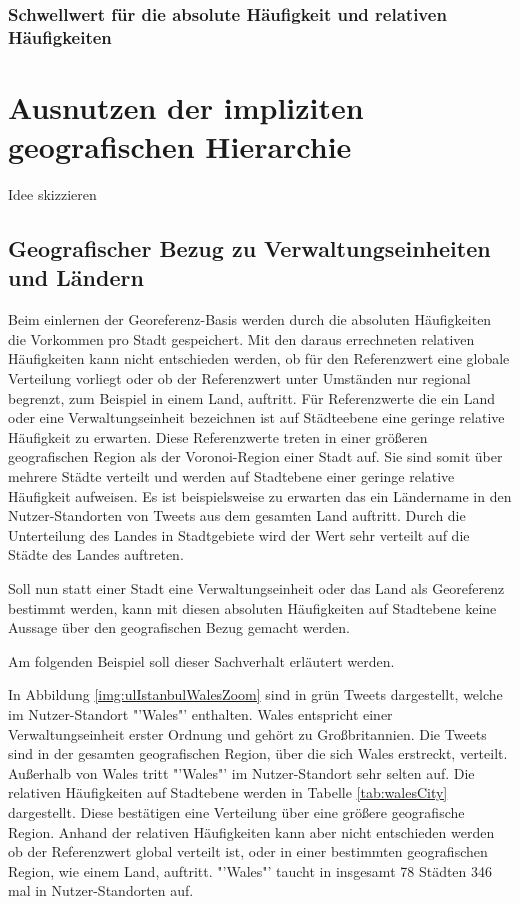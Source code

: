 		\subsubsection{Schwellwert für die absolute Häufigkeit und relativen Häufigkeiten}  

	\section{Ausnutzen der impliziten geografischen Hierarchie}

		Idee skizzieren

		\subsection{Geografischer Bezug zu Verwaltungseinheiten und Ländern} 

			Beim einlernen der Georeferenz-Basis werden durch die absoluten Häufigkeiten die Vorkommen pro Stadt gespeichert.
			Mit den daraus errechneten relativen Häufigkeiten kann nicht entschieden werden, ob für den Referenzwert eine globale Verteilung vorliegt oder ob der Referenzwert unter Umständen nur regional begrenzt, zum Beispiel in einem Land, auftritt.
			Für Referenzwerte die ein Land oder eine Verwaltungseinheit bezeichnen ist auf Städteebene eine geringe relative Häufigkeit zu erwarten.
			Diese Referenzwerte treten in einer größeren geografischen Region als der Voronoi-Region einer Stadt auf.
			Sie sind somit über mehrere Städte verteilt und werden auf Stadtebene einer geringe relative Häufigkeit aufweisen.
			Es ist beispielsweise zu erwarten das ein Ländername in den Nutzer-Standorten von Tweets aus dem gesamten Land auftritt.
			Durch die Unterteilung des Landes in Stadtgebiete wird der Wert sehr verteilt auf die Städte des Landes auftreten.

			Soll nun statt einer Stadt eine Verwaltungseinheit oder das Land als Georeferenz bestimmt werden, kann mit diesen absoluten Häufigkeiten auf Stadtebene keine Aussage über den geografischen Bezug gemacht werden. 
			
			Am folgenden Beispiel soll dieser Sachverhalt erläutert werden.

			In Abbildung \ref{img:ulIstanbulWalesZoom} sind in grün Tweets dargestellt, welche im Nutzer-Standort "'Wales"' enthalten.
			Wales entspricht einer Verwaltungseinheit erster Ordnung und gehört zu Großbritannien.
			Die Tweets sind in der gesamten geografischen Region, über die sich Wales erstreckt, verteilt.
			Außerhalb von Wales tritt "'Wales"' im Nutzer-Standort sehr selten auf.
			Die relativen Häufigkeiten auf Stadtebene werden in Tabelle \ref{tab:walesCity} dargestellt.
			Diese bestätigen eine Verteilung über eine größere geografische Region.
			Anhand der relativen Häufigkeiten kann aber nicht entschieden werden ob der Referenzwert global verteilt ist, oder in einer bestimmten geografischen Region, wie einem Land, auftritt. 
			"'Wales"' taucht in insgesamt 78 Städten 346 mal in Nutzer-Standorten auf.

